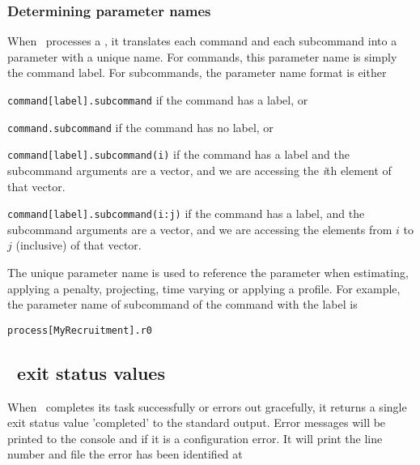 \subsubsection{Determining parameter names\label{sec:parameter-names}}

When \CNAME\ processes a \config, it translates each command and each subcommand into a parameter with a unique name. For commands, this parameter name is simply the command label. For subcommands, the parameter name format is either 

\begin{description}
\item \texttt{command[label].subcommand} if the command has a label, or
\item \texttt{command.subcommand} if the command has no label, or
\item \texttt{command[label].subcommand(i)} if the command has a label and the subcommand arguments are a vector, and we are accessing the  \emph{i}th element of that vector. 
\item \texttt{command[label].subcommand(i:j)} if the command has a label, and the subcommand arguments are a vector, and we are accessing the elements from $i$ to $j$ (inclusive) of that vector.
\end{description} 

The unique parameter name is used to reference the parameter when estimating, applying a penalty, projecting, time varying or applying a profile. For example, the parameter name of subcommand  of the command  with the label  is

\texttt{process[MyRecruitment].r0}

\subsection{\CNAME\ exit status values}
When \CNAME\ completes its task successfully or errors out gracefully, it returns a single exit status value 'completed' to the standard output. Error messages will be printed to the console and if it is a configuration error. It will print the line number and file the error has been identified at
